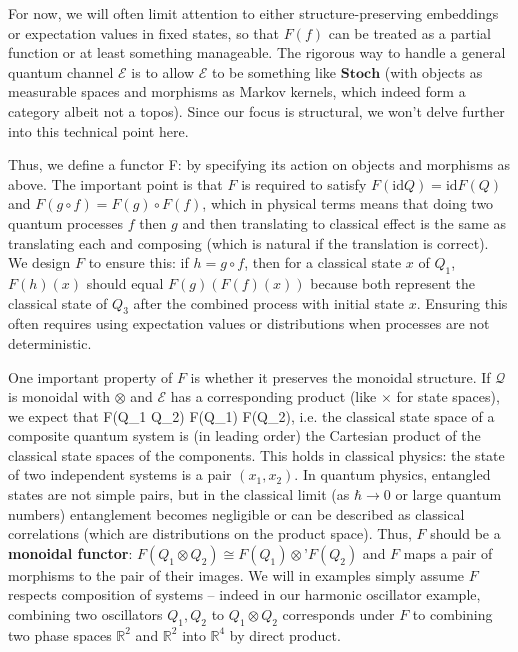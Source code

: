 For now, we will often limit attention to either structure-preserving embeddings or expectation values in fixed states, so that $F(f)$ can be treated as a partial function or at least something manageable. The rigorous way to handle a general quantum channel $\mathcal{E}$ is to allow $\mathcal{E}$ to be something like $\mathbf{Stoch}$ (with objects as measurable spaces and morphisms as Markov kernels, which indeed form a category albeit not a topos). Since our focus is structural, we won’t delve further into this technical point here.

Thus, we define a functor
F:  \to {}
by specifying its action on objects and morphisms as above. The important point is that $F$ is required to satisfy $F(\mathrm{id}Q) = \mathrm{id}{F(Q)}$ and $F(g\circ f) = F(g)\circ F(f)$, which in physical terms means that doing two quantum processes $f$ then $g$ and then translating to classical effect is the same as translating each and composing (which is natural if the translation is correct). We design $F$ to ensure this: if $h = g\circ f$, then for a classical state $x$ of $Q_1$, $F(h)(x)$ should equal $F(g)(F(f)(x))$ because both represent the classical state of $Q_3$ after the combined process with initial state $x$. Ensuring this often requires using expectation values or distributions when processes are not deterministic.

One important property of $F$ is whether it preserves the monoidal structure. If $\mathcal{Q}$ is monoidal with $\otimes$ and $\mathcal{E}$ has a corresponding product (like $\times$ for state spaces), we expect that
F(Q_1 \otimes Q_2) \cong F(Q_1) \times F(Q_2),
i.e. the classical state space of a composite quantum system is (in leading order) the Cartesian product of the classical state spaces of the components. This holds in classical physics: the state of two independent systems is a pair $(x_1, x_2)$. In quantum physics, entangled states are not simple pairs, but in the classical limit (as $\hbar\to0$ or large quantum numbers) entanglement becomes negligible or can be described as classical correlations (which are distributions on the product space). Thus, $F$ should be a \textbf{monoidal functor}: $F(Q_1 \otimes Q_2) \cong F(Q_1)\otimes’ F(Q_2)$ and $F$ maps a pair of morphisms to the pair of their images. We will in examples simply assume $F$ respects composition of systems – indeed in our harmonic oscillator example, combining two oscillators $Q_1, Q_2$ to $Q_1\otimes Q_2$ corresponds under $F$ to combining two phase spaces $\mathbb{R}^2$ and $\mathbb{R}^2$ into $\mathbb{R}^4$ by direct product.

